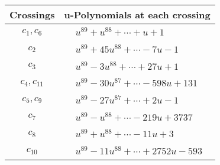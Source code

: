 \documentclass[1p]{elsarticle_modified}
\theoremstyle{definition}
\begin{document}
\begin{tabular}{m{50pt}|m{274pt}}
Crossings & \hspace{64pt}u-Polynomials at each crossing \\
\hline $$\begin{aligned}c_{1},c_{6}\end{aligned}$$&$\begin{aligned}
&u^{89}+u^{88}+\cdots+u+1
\end{aligned}$\\
\hline $$\begin{aligned}c_{2}\end{aligned}$$&$\begin{aligned}
&u^{89}+45 u^{88}+\cdots-7 u-1
\end{aligned}$\\
\hline $$\begin{aligned}c_{3}\end{aligned}$$&$\begin{aligned}
&u^{89}-3 u^{88}+\cdots+27 u+1
\end{aligned}$\\
\hline $$\begin{aligned}c_{4},c_{11}\end{aligned}$$&$\begin{aligned}
&u^{89}-30 u^{87}+\cdots-598 u+131
\end{aligned}$\\
\hline $$\begin{aligned}c_{5},c_{9}\end{aligned}$$&$\begin{aligned}
&u^{89}-27 u^{87}+\cdots+2 u-1
\end{aligned}$\\
\hline $$\begin{aligned}c_{7}\end{aligned}$$&$\begin{aligned}
&u^{89}- u^{88}+\cdots-219 u+3737
\end{aligned}$\\
\hline $$\begin{aligned}c_{8}\end{aligned}$$&$\begin{aligned}
&u^{89}+u^{88}+\cdots-11 u+3
\end{aligned}$\\
\hline $$\begin{aligned}c_{10}\end{aligned}$$&$\begin{aligned}
&u^{89}-11 u^{88}+\cdots+2752 u-593
\end{aligned}$\\
\hline
\end{tabular}\\~\\
\end{document}
